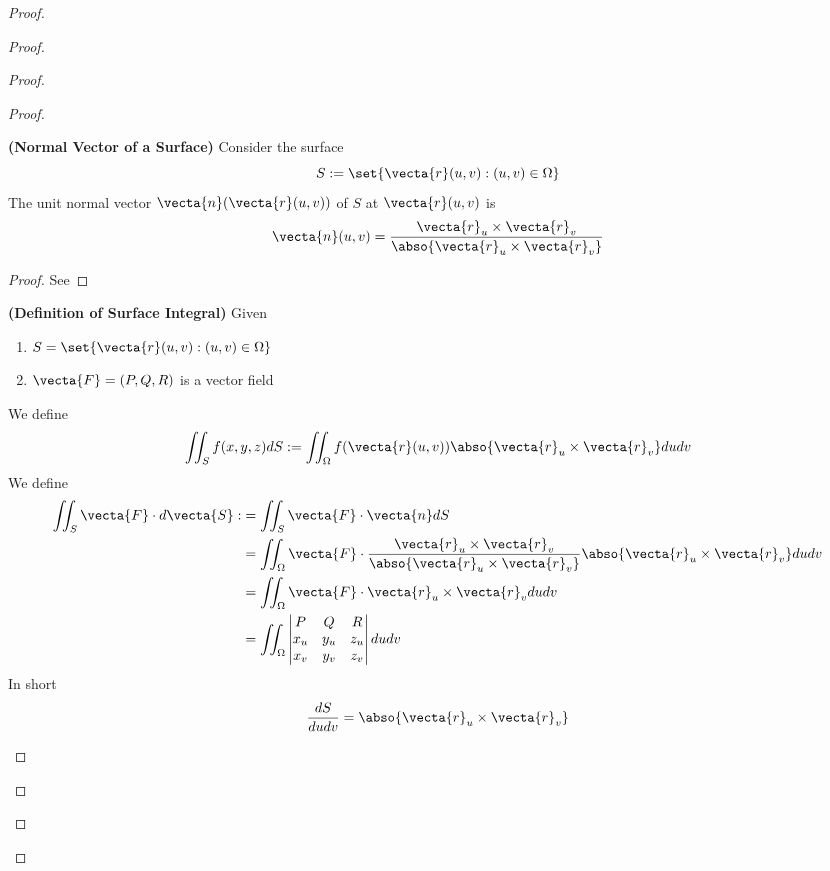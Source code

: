 \documentclass{report}
\begin{document}
\begin{proof}
\begin{proof}
\begin{proof}
\begin{proof}
\begin{theorem}
\label{10.1.1}
\textbf{(Normal Vector of a Surface)} Consider the surface 
\begin{equation*}
S:=\set{\vecta{r}(u,v):(u,v)\in \Omega}
\end{equation*}
The unit normal vector $\vecta{n}(\vecta{r}(u,v))$ of $S$ at  $\vecta{r}(u,v)$ is 
\begin{align*}
\vecta{n}(u,v)=\frac{\vecta{r}_u \times \vecta{r}_v}{\abso{\vecta{r}_u\times \vecta{r}_v}}
\end{align*}
\end{theorem}
\begin{proof}
See 
\end{proof}
\begin{definition}
\label{10.1.2}
\textbf{(Definition of Surface Integral)} Given
\begin{enumerate}[label=(\alph*)]
  \item $S=\set{\vecta{r}(u,v):(u,v)\in \Omega}$
  \item $\vecta{F}=(P,Q,R)$ is a vector field
\end{enumerate}
We define 
\begin{equation*}
\iint_S f(x,y,z)dS:=\iint_{\Omega} f(\vecta{r}(u,v))\abso{\vecta{r}_u\times \vecta{r}_v}dudv
\end{equation*}
We define 
\begin{align*}
\iint_S \vecta{F}\cdot d\vecta{S}:&=\iint_S \vecta{F}\cdot \vecta{n}dS\\
&=\iint_{\Omega} \vecta{F}\cdot \frac{\vecta{r}_u\times \vecta{r}_v}{\abso{\vecta{r}_u\times \vecta{r}_v}}  \abso{\vecta{r}_u\times \vecta{r}_v} dudv\\
&=\iint_{\Omega} \vecta{F}\cdot \vecta{r}_u \times \vecta{r}_v dudv\\
&=\iint_{\Omega} \begin{vmatrix} 
  P & Q & R\\
  x_u & y_u & z_u \\
  x_v & y_v & z_v
\end{vmatrix} dudv
\end{align*}
In short 
\begin{align*}
\frac{dS}{dudv}=\abso{\vecta{r}_u \times \vecta{r}_v}
\end{align*}
\end{definition}
\begin{theorem}

\end{theorem}
\end{proof}
\end{proof}
\end{proof}
\end{proof}
\end{document}
